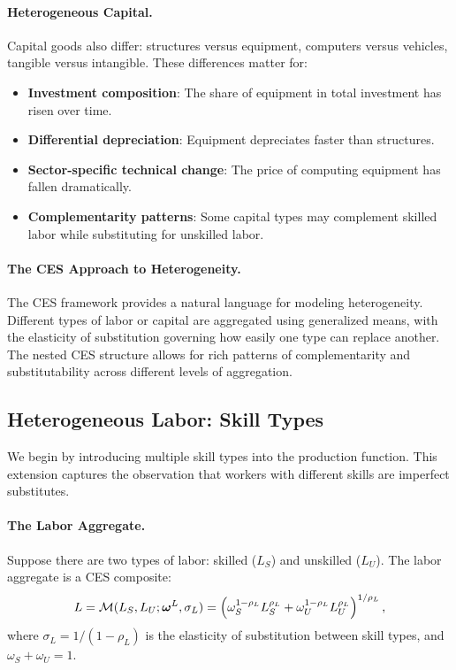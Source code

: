 \paragraph{Heterogeneous Capital.}
Capital goods also differ: structures versus equipment, computers versus vehicles, tangible versus intangible. These differences matter for:
\begin{itemize}[nosep]
\item \textbf{Investment composition}: The share of equipment in total investment has risen over time.
\item \textbf{Differential depreciation}: Equipment depreciates faster than structures.
\item \textbf{Sector-specific technical change}: The price of computing equipment has fallen dramatically.
\item \textbf{Complementarity patterns}: Some capital types may complement skilled labor while substituting for unskilled labor.
\end{itemize}

\paragraph{The CES Approach to Heterogeneity.}
The CES framework provides a natural language for modeling heterogeneity. Different types of labor or capital are aggregated using generalized means, with the elasticity of substitution governing how easily one type can replace another. The nested CES structure allows for rich patterns of complementarity and substitutability across different levels of aggregation.

\subsection{Heterogeneous Labor: Skill Types}
\label{subsec:heterogeneous-labor}

We begin by introducing multiple skill types into the production function. This extension captures the observation that workers with different skills are imperfect substitutes.

\paragraph{The Labor Aggregate.}
Suppose there are two types of labor: skilled ($L_S$) and unskilled ($L_U$). The labor aggregate is a CES composite:
\begin{equation}
L = \mathcal{M}(L_S, L_U; \boldsymbol{\omega}^L, \sigma_L) = \left( \omega_S^{1-\rho_L} L_S^{\rho_L} + \omega_U^{1-\rho_L} L_U^{\rho_L} \right)^{1/\rho_L},
\label{eq:labor-aggregate}
\end{equation}
where $\sigma_L = 1/(1-\rho_L)$ is the elasticity of substitution between skill types, and $\omega_S + \omega_U = 1$.

